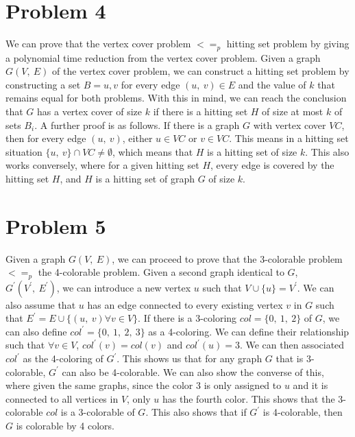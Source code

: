 \documentclass[12pt]{article}
\begin{document}
\section*{Problem 4}
We can prove that the vertex cover problem $<=_p$ hitting set problem by giving a polynomial time reduction from
the vertex cover problem. Given a graph $G(V,\ E)$ of the vertex cover problem, we can construct a hitting set problem
by constructing a set $B = {u, v}$ for every edge $(u,\ v) \in E$ and the value of $k$ that remains equal for both problems.
With this in mind, we can reach the conclusion that $G$ has a vertex cover of size $k$ if there is a hitting set $H$ of size at most $k$ of sets 
$B_i$.
\newline
\newline
A further proof is as follows. If there is a graph $G$ with vertex cover $VC$, then for every edge $(u,\ v)$, either 
$u \in VC$ or $v \in VC$. This means in a hitting set situation $\{u,\ v\} \cap VC \neq \emptyset$, which means that 
$H$ is a hitting set of size $k$. This also works conversely, where for a given hitting set $H$, every edge is covered
by the hitting set $H$, and $H$ is a hitting set of graph $G$ of size $k$.

\newpage
\section*{Problem 5}
Given a graph $G(V,\ E)$, we can proceed to prove that the 3-colorable problem $<=_p$ the 4-colorable problem. Given a 
second graph identical to $G$, $G^\prime(V^\prime,\ E^\prime)$, we can introduce a new vertex $u$ such that $V \cup \{u\} = V^\prime$.
We can also assume that $u$ has an edge connected to every existing vertex $v$ in $G$ such that 
$E^\prime = E \cup \{(u,\ v) \forall v \in V\}$. 
\newline
\newline
If there is a 3-coloring $col = \{0,\ 1,\ 2\}$ of $G$, we can also define $col^\prime = \{0,\ 1,\ 2,\ 3\}$ as a 4-coloring.
We can define their relationship such that $\forall v \in V$, $col^\prime(v) = col(v)$ and $col^\prime(u) = 3$. We can then associated
$col^\prime$ as the 4-coloring of $G^\prime$. This shows us that for any graph $G$ that is 3-colorable, $G^\prime$ can also be 4-colorable.
We can also show the converse of this, where given the same graphs, since the color 3 is only assigned to $u$ and it is 
connected to all vertices in $V$, only $u$ has the fourth color. This shows that the 3-colorable $col$ is a 3-colorable of $G$. This also shows
that if $G^\prime$ is 4-colorable, then $G$ is colorable by 4 colors.
\end{document}
